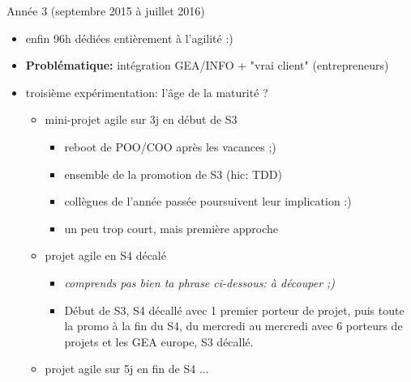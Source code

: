 \documentclass{beamer}
\begin{document}
\begin{frame}{Année 3 (septembre 2015 à juillet 2016)}
  \begin{itemize}
    \item enfin 96h dédiées entièrement à l'agilité :)
    \item \textbf{Problématique:} intégration GEA/INFO + "vrai client" (entrepreneurs) 
    \item troisième expérimentation: l'âge de la maturité ?
      \begin{itemize}
        \item mini-projet agile sur 3j en début de S3
        \begin{itemize}
          \item reboot de POO/COO après les vacances ;)
          \item ensemble de la promotion de S3 (hic: TDD)
          \item collègues de l'année passée poursuivent leur implication :)
          \item un peu trop court, mais première approche
        \end{itemize}
        \item projet agile en S4 décalé
        \begin{itemize}
          \item \emph{comprends pas bien ta phrase ci-dessous: à découper ;)}
          \item Début de S3, S4 décallé avec 1 premier porteur de projet, puis toute la promo à la fin du S4, du mercredi au mercredi avec 6 porteurs de projets et les GEA europe, S3 décallé.
        \end{itemize}
        \item projet agile sur 5j en fin de S4 ...
      \end{itemize}
  \end{itemize}
\end{frame}
\end{document}
